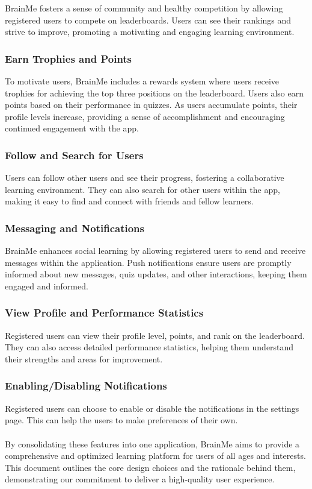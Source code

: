 BrainMe fosters a sense of community and healthy competition by allowing registered users to compete on leaderboards. Users can see their rankings and strive to improve, promoting a motivating and engaging learning environment.

\subsubsection{Earn Trophies and Points}

To motivate users, BrainMe includes a rewards system where users receive trophies for achieving the top three positions on the leaderboard. Users also earn points based on their performance in quizzes. As users accumulate points, their profile levels increase, providing a sense of accomplishment and encouraging continued engagement with the app.

\subsubsection{Follow and Search for Users}

Users can follow other users and see their progress, fostering a collaborative learning environment. They can also search for other users within the app, making it easy to find and connect with friends and fellow learners.

\subsubsection{Messaging and Notifications}

BrainMe enhances social learning by allowing registered users to send and receive messages within the application. Push notifications ensure users are promptly informed about new messages, quiz updates, and other interactions, keeping them engaged and informed.

\subsubsection{View Profile and Performance Statistics}

Registered users can view their profile level, points, and rank on the leaderboard. They can also access detailed performance statistics, helping them understand their strengths and areas for improvement.

\subsubsection{Enabling/Disabling Notifications}

Registered users can choose to enable or disable the notifications in the settings page. This can help the users to make preferences of their own. \\\\
By consolidating these features into one application, BrainMe aims to provide a comprehensive and optimized learning platform for users of all ages and interests. This document outlines the core design choices and the rationale behind them, demonstrating our commitment to deliver a high-quality user experience.